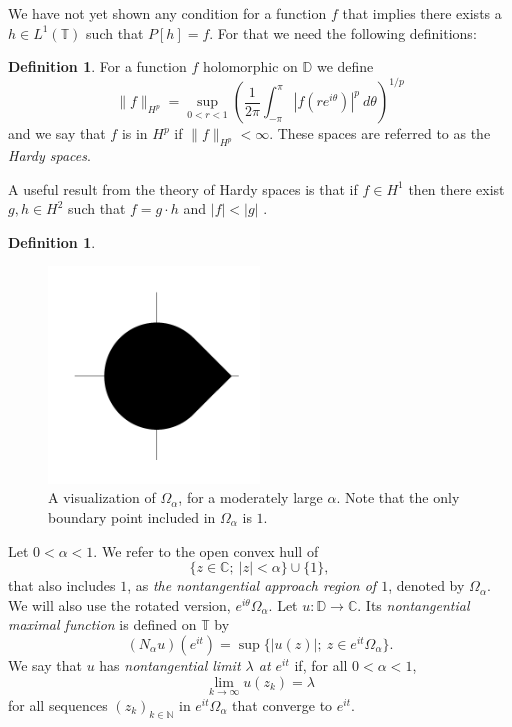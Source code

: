 \documentclass[a4paper,12pt,twoside,BCOR=10mm]{scrbook}
\theoremstyle{definition}
\theoremstyle{definition}
\theoremstyle{definition}
\newtheorem{definition}[theorem]{Definition}
\begin{document}
We have not yet shown any condition for a function $f$ that implies there exists a $h \in L^1(\mathbb{T})$ such that $P[h] = f$.
For that we need the following definitions:
\begin{definition}
For a function $f$ holomorphic on $\mathbb{D}$ we define
\[
	\|f\|_{H^p} = 
	\sup_{0 < r < 1} \left ( \frac{1}{2\pi}\int_{-\pi}^{\pi} |f(re^{i\theta})|^p\ d\theta \right )^{1/p}
\]
and we say that $f$ is in $H^p$ if $\|f\|_{H^p} < \infty$.
These spaces are referred to as the \emph{Hardy spaces}.
\end{definition}
A useful result from the theory of Hardy spaces is that if $f \in H^1$ then there exist $g, h \in H^2$ such that $f = g \cdot h$ and $|f| < |g|$ \citep[Theorem $17.10$]{rudin2}.
\begin{definition}
\begin{figure}[h]
\centering
\includegraphics[width=0.5\textwidth]{approach-region-7}
\caption{A visualization of $\Omega_{\alpha}$, for a moderately large $\alpha$. Note that the only boundary point included in $\Omega_{\alpha}$ is $1$. }
\end{figure}
Let $0 < \alpha < 1$.
We refer to the open convex hull of
\[
	\{z \in \mathbb{C};\ |z| < \alpha\} \cup \{1\},
\]
that also includes $1$, as \emph{the nontangential approach region of $1$}, denoted by $\Omega_{\alpha}$.
We will also use the rotated version, $e^{i\theta}\Omega_{\alpha}$.
Let $u: \mathbb{D} \rightarrow \mathbb{C}$.
Its \emph{nontangential maximal function} is defined on $\mathbb{T}$ by
\[
	(N_{\alpha}u)(e^{it}) = \sup \{|u(z)|;\ z \in e^{it}\Omega_{\alpha}\}.
\]
We say that $u$ has \emph{nontangential limit $\lambda$ at $e^{it}$} if, for all $0 < \alpha < 1$,
\[
	\lim_{k \rightarrow \infty} u(z_k) = \lambda
\]
for all sequences $(z_k)_{k \in \mathbb{N}}$ in $e^{it}\Omega_{\alpha}$ that converge to $e^{it}$.
\end{definition}
\end{document}
